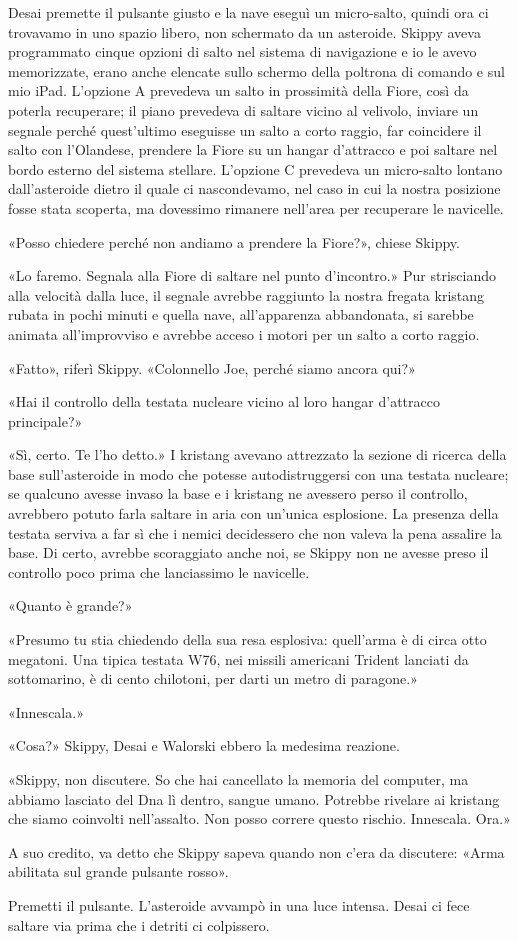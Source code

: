 Desai premette il pulsante giusto e la nave eseguì un micro-salto,
quindi ora ci trovavamo in uno spazio libero, non schermato da un
asteroide. Skippy aveva programmato cinque opzioni di salto nel sistema
di navigazione e io le avevo memorizzate, erano anche elencate sullo
schermo della poltrona di comando e sul mio iPad. L'opzione A prevedeva
un salto in prossimità della Fiore, così da poterla recuperare; il piano
prevedeva di saltare vicino al velivolo, inviare un segnale perché
quest'ultimo eseguisse un salto a corto raggio, far coincidere il salto
con l'Olandese, prendere la Fiore su un hangar d'attracco e poi saltare
nel bordo esterno del sistema stellare. L'opzione C prevedeva un
micro-salto lontano dall'asteroide dietro il quale ci nascondevamo, nel
caso in cui la nostra posizione fosse stata scoperta, ma dovessimo
rimanere nell'area per recuperare le navicelle.

«Posso chiedere perché non andiamo a prendere la Fiore?», chiese Skippy.

«Lo faremo. Segnala alla Fiore di saltare nel punto d'incontro.» Pur
strisciando alla velocità dalla luce, il segnale avrebbe raggiunto la
nostra fregata kristang rubata in pochi minuti e quella nave,
all'apparenza abbandonata, si sarebbe animata all'improvviso e avrebbe
acceso i motori per un salto a corto raggio.

«Fatto», riferì Skippy. «Colonnello Joe, perché siamo ancora qui?»

«Hai il controllo della testata nucleare vicino al loro hangar
d'attracco principale?»

«Sì, certo. Te l'ho detto.» I kristang avevano attrezzato la sezione di
ricerca della base sull'asteroide in modo che potesse autodistruggersi
con una testata nucleare; se qualcuno avesse invaso la base e i kristang
ne avessero perso il controllo, avrebbero potuto farla saltare in aria
con un'unica esplosione. La presenza della testata serviva a far sì che
i nemici decidessero che non valeva la pena assalire la base. Di certo,
avrebbe scoraggiato anche noi, se Skippy non ne avesse preso il
controllo poco prima che lanciassimo le navicelle.

«Quanto è grande?»

«Presumo tu stia chiedendo della sua resa esplosiva: quell'arma è di
circa otto megatoni. Una tipica testata W76, nei missili americani
Trident lanciati da sottomarino, è di cento chilotoni, per darti un
metro di paragone.»

«Innescala.»

«Cosa?» Skippy, Desai e Walorski ebbero la medesima reazione.

«Skippy, non discutere. So che hai cancellato la memoria del computer,
ma abbiamo lasciato del Dna lì dentro, sangue umano. Potrebbe rivelare
ai kristang che siamo coinvolti nell'assalto. Non posso correre questo
rischio. Innescala. Ora.»

A suo credito, va detto che Skippy sapeva quando non c'era da discutere:
«Arma abilitata sul grande pulsante rosso».

Premetti il pulsante. L'asteroide avvampò in una luce intensa. Desai ci
fece saltare via prima che i detriti ci colpissero.